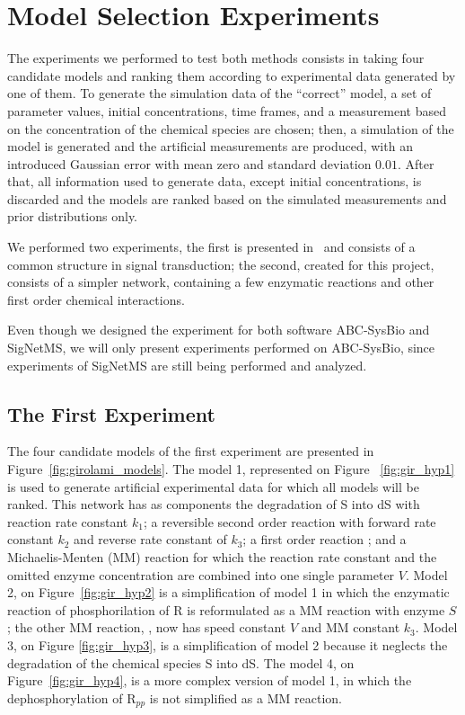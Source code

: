 \section{Model Selection Experiments}
The experiments we performed to test both methods consists in taking 
four candidate models and ranking them according to experimental data 
generated by one of them. To generate the simulation data of the 
``correct'' model, a set of parameter values, initial concentrations, 
time frames, and a measurement based on the concentration of the 
chemical species are chosen; then, a simulation of the model is 
generated and the artificial measurements are produced, with an 
introduced Gaussian error with mean zero and standard deviation $0.01$. 
After that, all information used to generate data, except initial 
concentrations, is discarded and the models are ranked based on the 
simulated measurements and prior distributions only.

We performed two experiments, the first is presented 
in~\cite{Vyshemirsky2007} and consists of a common structure in signal 
transduction; the second, created for this project, consists of a 
simpler network, containing a few enzymatic reactions and other first 
order chemical interactions.

Even though we designed the experiment for both software ABC-SysBio and
SigNetMS, we will only present experiments performed on ABC-SysBio, 
since experiments of SigNetMS are still being performed and analyzed.


\subsection{The First Experiment}
\label{sec:experiment_one}
The four candidate models of the first experiment are presented in 
Figure~\ref{fig:girolami_models}. The model 1, represented on Figure
~\ref{fig:gir_hyp1} is used to generate artificial experimental data
for which all models will be ranked. This network has as components the
degradation of S into dS with reaction rate constant $k_1$; a reversible 
second order reaction  with forward rate constant $k_2$ 
and reverse rate constant of $k_3$; a first order reaction 
; and a Michaelis-Menten (MM) reaction  
for which the reaction rate constant and the omitted enzyme 
concentration are combined into one single parameter $V$. Model 2, on 
Figure~\ref{fig:gir_hyp2} is a simplification of model 1 in which the
enzymatic reaction of phosphorilation of R is reformulated as a 
MM reaction with enzyme $S$; the other MM reaction, , 
now has speed constant $V$ and MM constant $k_3$. Model 3, on Figure
\ref{fig:gir_hyp3}, is a simplification of model 2 because it neglects 
the degradation of the chemical species S into dS. The model 4, on 
Figure~\ref{fig:gir_hyp4}, is a more complex version of model 1, in 
which the dephosphorylation of R$_{pp}$ is not simplified as a MM 
reaction.

